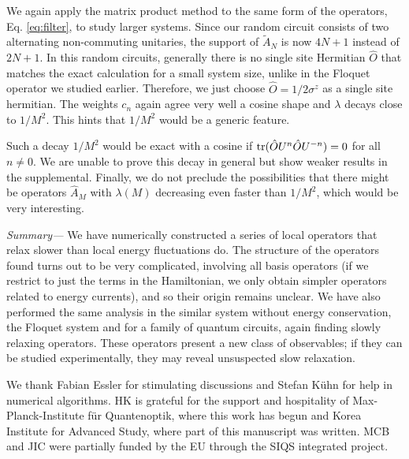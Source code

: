 \documentclass[twocolumn,superscriptaddress, prl,showpacs]{revtex4-1}
\begin{document}
We again apply the matrix product method to the same form of the operators, Eq. \eqref{eq:filter},
to study larger systems. Since our random circuit consists of two alternating non-commuting unitaries,
the support of $\tilde{A}_N$ is now $4N+1$ instead of $2N+1$.
In this random circuits, generally there is no single site Hermitian $\hat{O}$
that matches the exact calculation for a small system size, unlike in the Floquet operator we studied earlier.
Therefore, we just choose $\hat{O} = 1/2\sigma^z$ as a single site hermitian.
The weights $c_n$ again agree very well a cosine shape and $\lambda$ decays close to $1/M^2$.
This hints that $1/M^2$ would be a generic feature.

Such a decay $1/M^2$ would be exact with a cosine if
${\rm tr}(\hat{O} U^n \hat{O} U^{- n})=0$ for all $n \neq 0$.
We are unable to prove this decay in general but show weaker results in the supplemental.
Finally, we do not preclude the possibilities that
there might be operators $\hat{A}_M$ with $\lambda(M)$ decreasing even faster than $1/M^2$,
which would be very interesting.


{\it Summary---}
We have numerically constructed a series of local operators that relax slower than local energy fluctuations do.
The structure of the operators found turns out to be very complicated, involving all basis operators
(if we restrict to just the terms in the Hamiltonian, we only obtain simpler operators related to energy currents),
and so their origin remains unclear.
We have also performed the same analysis in the similar system without energy conservation,
the Floquet system and for a family of quantum circuits, again finding slowly relaxing operators.
These operators present a new class of observables; if they can be studied experimentally, they may reveal unsuspected slow relaxation.

We thank Fabian Essler for stimulating discussions and Stefan K\"{u}hn for help in numerical algorithms.
HK is grateful for the support and hospitality of Max-Planck-Institute f\"{u}r Quantenoptik,
where this work has begun and Korea Institute for Advanced Study, where part of this manuscript was written.
MCB and JIC were partially funded by the EU through the SIQS integrated project.



\end{document}
